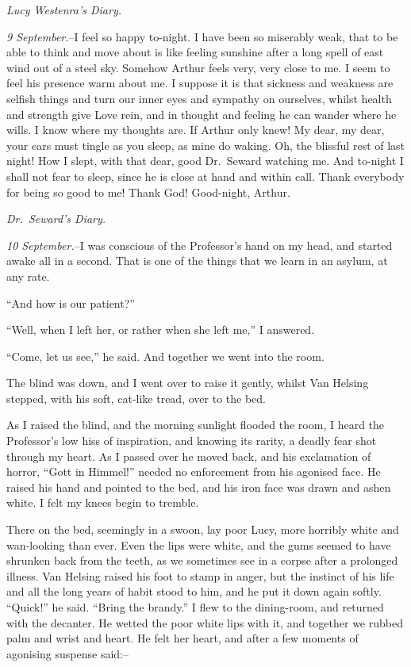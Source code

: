 \documentclass[12pt,openright]{book}
\begin{document}
\textit{Lucy Westenra’s Diary.}

\textit{9 September.}–I feel so happy to-night. I have been so miserably weak, that to be able to think and move about is like feeling sunshine after a long spell of east wind out of a steel sky. Somehow Arthur feels very, very close to me. I seem to feel his presence warm about me. I suppose it is that sickness and weakness are selfish things and turn our inner eyes and sympathy on ourselves, whilst health and strength give Love rein, and in thought and feeling he can wander where he wills. I know where my thoughts are. If Arthur only knew! My dear, my dear, your ears must tingle as you sleep, as mine do waking. Oh, the blissful rest of last night! How I slept, with that dear, good Dr. Seward watching me. And to-night I shall not fear to sleep, since he is close at hand and within call. Thank everybody for being so good to me! Thank God! Good-night, Arthur.

\textit{Dr. Seward’s Diary.}

\textit{10 September.}–I was conscious of the Professor’s hand on my head, and started awake all in a second. That is one of the things that we learn in an asylum, at any rate.

“And how is our patient?”

“Well, when I left her, or rather when she left me,” I answered.

“Come, let us see,” he said. And together we went into the room.

The blind was down, and I went over to raise it gently, whilst Van Helsing stepped, with his soft, cat-like tread, over to the bed.

As I raised the blind, and the morning sunlight flooded the room, I heard the Professor’s low hiss of inspiration, and knowing its rarity, a deadly fear shot through my heart. As I passed over he moved back, and his exclamation of horror, “Gott in Himmel!” needed no enforcement from his agonised face. He raised his hand and pointed to the bed, and his iron face was drawn and ashen white. I felt my knees begin to tremble.

There on the bed, seemingly in a swoon, lay poor Lucy, more horribly white and wan-looking than ever. Even the lips were white, and the gums seemed to have shrunken back from the teeth, as we sometimes see in a corpse after a prolonged illness. Van Helsing raised his foot to stamp in anger, but the instinct of his life and all the long years of habit stood to him, and he put it down again softly. “Quick!” he said. “Bring the brandy.” I flew to the dining-room, and returned with the decanter. He wetted the poor white lips with it, and together we rubbed palm and wrist and heart. He felt her heart, and after a few moments of agonising suspense said:–
\end{document}
